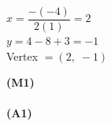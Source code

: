 \documentclass[12pt, twoside]{article}
\begin{document}
\begin{enumerate}[itemsep=0.2cm]
\begin{enumerate}[itemsep=0.3cm]
  \begin{minipage}[t]{0.62\textwidth}
  $x = \dfrac{-(-4)}{2(1)} = 2$\\[0.15cm]
  $y = 4 - 8 + 3 = -1$\\[0.15cm]
  Vertex $= (2,\; -1)$
  \end{minipage}%
  \begin{minipage}[t]{0.35\textwidth}\raggedleft
  \textbf{(M1)}\\[0.15cm]
  ~\\[0.15cm]
  \textbf{(A1)}
  \end{minipage}
\end{enumerate}

\end{enumerate}
\end{document}
